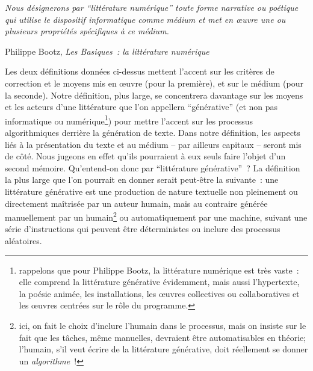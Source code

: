 \documentclass{article}
\newenvironment{citationbox}
{\begin{center}
		\begin{minipage}{.8\textwidth}
		}
		{
		\end{minipage}	
\end{center}
}
\begin{document}
			\begin{citationbox}
				\textit{Nous désignerons par ``littérature numérique'' toute forme narrative ou poétique qui utilise le dispositif informatique comme médium et met en œuvre une ou plusieurs propriétés spécifiques à ce médium.}
				\begin{flushright}
					Philippe Bootz, \textit{Les Basiques~: la littérature numérique} \cite{bootz2006}
				\end{flushright}
			\end{citationbox}
			Les deux définitions données ci-dessus mettent l'accent sur les critères de correction et le moyens mis en œuvre (pour la première), et sur le médium (pour la seconde). Notre définition, plus large, se concentrera davantage sur les moyens et les acteurs d'une littérature que l'on appellera ``générative'' (et non pas informatique ou numérique\footnote{rappelons que pour Philippe Bootz, la littérature numérique est très vaste~: elle comprend la littérature générative évidemment, mais aussi l’hypertexte, la poésie animée, les installations, les œuvres collectives ou collaboratives et les œuvres centrées sur le rôle du programme.}) pour mettre l'accent sur les processus algorithmiques derrière la génération de texte. Dans notre définition, les aspects liés à la présentation du texte et au médium -- par ailleurs capitaux -- seront mis de côté. Nous jugeons en effet qu'ils pourraient à eux seuls faire l'objet d'un second mémoire.
			Qu'entend-on donc par ``littérature générative''~? La définition la plus large que l'on pourrait en donner serait peut-être la suivante~: une littérature générative est une production de nature textuelle non pleinement ou directement maîtrisée par un auteur humain, mais au contraire générée manuellement par un humain\footnote{ici, on fait le choix d'inclure l'humain dans le processus, mais on insiste sur le fait que les tâches, même manuelles, devraient être automatisables en théorie; l'humain, s'il veut écrire de la littérature générative, doit réellement se donner un \textit{algorithme}~!} ou automatiquement par une machine, suivant une série d'instructions qui peuvent être déterministes ou inclure des processus aléatoires.\\
\end{document}
